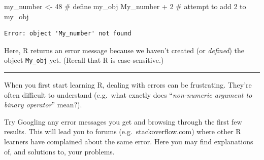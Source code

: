 \documentclass[
  letterpaper,
  DIV=11,
  numbers=noendperiod]{scrreprt}
\newenvironment{Shaded}{\begin{snugshade}}{\end{snugshade}}
\newcommand{\CommentTok}[1]{\textcolor[rgb]{0.37,0.37,0.37}{#1}}
\newcommand{\DecValTok}[1]{\textcolor[rgb]{0.68,0.00,0.00}{#1}}
\newcommand{\NormalTok}[1]{\textcolor[rgb]{0.00,0.23,0.31}{#1}}
\newcommand{\OtherTok}[1]{\textcolor[rgb]{0.00,0.23,0.31}{#1}}
\newcommand{\SpecialCharTok}[1]{\textcolor[rgb]{0.37,0.37,0.37}{#1}}
\begin{document}
\begin{Shaded}
\begin{Highlighting}[]
\NormalTok{my\_number }\OtherTok{\textless{}{-}} \DecValTok{48} \CommentTok{\# define \textasciigrave{}my\_obj\textasciigrave{}}
\NormalTok{My\_number }\SpecialCharTok{+} \DecValTok{2} \CommentTok{\# attempt to add 2 to \textasciigrave{}my\_obj\textasciigrave{}}
\end{Highlighting}
\end{Shaded}

\begin{verbatim}
Error: object 'My_number' not found
\end{verbatim}

Here, R returns an error message because we haven't created (or
\emph{defined}) the object \texttt{My\_obj} yet. (Recall that R is
case-sensitive.)

\begin{center}\rule{0.5\linewidth}{0.5pt}\end{center}

When you first start learning R, dealing with errors can be frustrating.
They're often difficult to understand (e.g.~what exactly does
``\emph{non-numeric argument to binary operator}'' mean?).

Try Googling any error messages you get and browsing through the first
few results. This will lead you to forums (e.g.~stackoverflow.com) where
other R learners have complained about the same error. Here you may find
explanations of, and solutions to, your problems.
\end{document}
